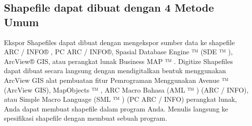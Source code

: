 \subsection{Shapefile dapat dibuat dengan 4 Metode Umum}
Ekspor Shapefiles dapat dibuat dengan mengekspor sumber data ke shapefile
ARC / INFO® , PC ARC / INFO®, Spasial Database Engine ™ (SDE ™ ), ArcView® GIS,
atau perangkat lunak Business MAP ™ .
Digitize Shapefiles dapat dibuat secara langsung dengan mendigitalkan bentuk menggunakan ArcView GIS
alat pembuatan fitur
Pemrograman Menggunakan Avenue ™ (ArcView GIS), MapObjects ™ , ARC Macro
Bahasa (AML ™ ) (ARC / INFO), atau Simple Macro Language (SML ™ )
(PC ARC / INFO) perangkat lunak, Anda dapat membuat shapefile dalam program Anda.
Menulis langsung ke spesifikasi shapefile dengan membuat sebuah program. 
